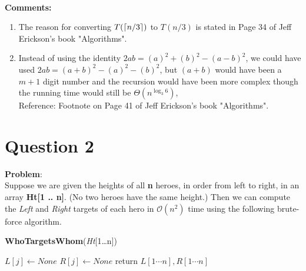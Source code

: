 \documentclass[11pt, fleqn]{article}
\DeclarePairedDelimiter\ceil{\lceil}{\rceil}
\begin{document}
~\\
\textbf{Comments:}
\begin{enumerate}[noitemsep]
    \item The reason for converting $T(\ceil{n/3})$ to $T(n/3)$ is stated in Page 34 of Jeff Erickson's book "Algorithms".
    \item Instead of using the identity $2ab = (a)^2 + (b)^2 - (a - b)^2$, we could have used $2ab = (a + b)^2 - (a)^2 - (b)^2$, but $(a + b)$ would have been a $m+1$ digit number and the recursion would have been more complex though the running time would still be $\Theta(n^{\log_3 6})$,\\
    Reference: Footnote on Page 41 of Jeff Erickson's book "Algorithms".
\end{enumerate}



\newpage 
\section*{Question 2}
\label{q2}
\setcounter{equation}{0}

\textbf{Problem}:\\
Suppose we are given the heights of all \textbf{n} heroes, in order from left to right, in an array \textbf{Ht[1 .. n]}. (No two heroes have the same height.) Then we can compute the \textit{Left} and \textit{Right} targets of each hero in $\mathcal{O}(n^2)$ time using the following brute-force algorithm.

\begin{algorithm}[H]
    \SetAlgoLined
    \DontPrintSemicolon
    \caption{\textbf{WhoTargetsWhom}(\textit{Ht}[1\dots n])}
     {
        $L[j] \leftarrow None$\;
        $R[j] \leftarrow None$\;
    }
    return $L[1 \cdots n], R[1 \cdots n]$\;
\end{algorithm}

~\\
\end{document}
